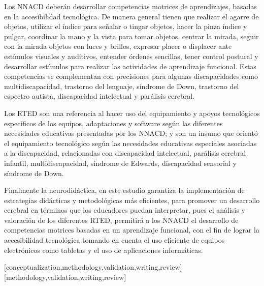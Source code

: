 \documentclass[spanish]{textolivre}
\begin{document}
Los NNACD deberán desarrollar competencias motrices de aprendizajes, basadas en la accesibilidad tecnológica. De manera general tienen que realizar el agarre de objetos, utilizar el índice para señalar o tingar objetos, hacer la pinza índice y pulgar, coordinar la mano y la vista para tomar objetos, centrar la mirada, seguir con la mirada objetos con luces y brillos, expresar placer o displacer ante estímulos visuales y auditivos, entender órdenes sencillas, tener control postural y desarrollar estímulos para realizar las actividades de aprendizaje funcional. Estas competencias se complementan con precisiones para algunas discapacidades como multidiscapacidad, trastorno del lenguaje, síndrome de Down, trastorno del espectro autista, discapacidad intelectual y parálisis cerebral.

Los RTED son una referencia al hacer uso del equipamiento y apoyos tecnológicos específicos de los equipos, adaptaciones y software según las diferentes necesidades educativas presentadas por los NNACD; y son un insumo que orientó el equipamiento tecnológico según las necesidades educativas especiales asociadas a la discapacidad, relacionadas con discapacidad intelectual, parálisis cerebral infantil, multidiscapacidad, síndrome de Edwards, discapacidad sensorial y síndrome de Down.

Finalmente la neurodidáctica, en este estudio garantiza la implementación de estrategias didácticas y metodológicas más eficientes, para promover un desarrollo cerebral en términos que los educadores puedan interpretar, pues el análisis y valoración de los diferentes RTED, permitirá a los NNACD el desarrollo de competencias motrices basadas en un aprendizaje funcional, con el fin de lograr la accesibilidad tecnológica tomando en cuenta el uso eficiente de equipos electrónicos como tabletas y el uso de aplicaciones informáticas.

\printbibliography\label{sec-bib}


\begin{contributors}
[conceptualization,methodology,validation,writing,review]
[methodology,validation,writing,review]
\end{contributors}
\end{document}
